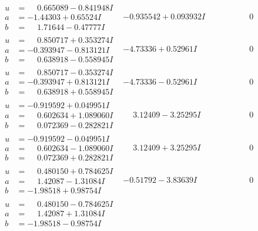 \documentclass[1p]{elsarticle_modified}
\theoremstyle{definition}
\begin{document}
$$\begin{array}{c|c|c}
\begin{aligned}
u &= \phantom{-}0.665089 - 0.841948 I \\
a &= -1.44303 + 0.65524 I \\
b &= \phantom{-}1.71644 - 0.47777 I\end{aligned}
 & -0.935542 + 0.093932 I & \phantom{-0.000000 } 0 \\ \hline\begin{aligned}
u &= \phantom{-}0.850717 + 0.353274 I \\
a &= -0.393947 - 0.813121 I \\
b &= \phantom{-}0.638918 - 0.558945 I\end{aligned}
 & -4.73336 + 0.52961 I & \phantom{-0.000000 } 0 \\ \hline\begin{aligned}
u &= \phantom{-}0.850717 - 0.353274 I \\
a &= -0.393947 + 0.813121 I \\
b &= \phantom{-}0.638918 + 0.558945 I\end{aligned}
 & -4.73336 - 0.52961 I & \phantom{-0.000000 } 0 \\ \hline\begin{aligned}
u &= -0.919592 + 0.049951 I \\
a &= \phantom{-}0.602634 + 1.089060 I \\
b &= \phantom{-}0.072369 - 0.282821 I\end{aligned}
 & \phantom{-}3.12409 - 3.25295 I & \phantom{-0.000000 } 0 \\ \hline\begin{aligned}
u &= -0.919592 - 0.049951 I \\
a &= \phantom{-}0.602634 - 1.089060 I \\
b &= \phantom{-}0.072369 + 0.282821 I\end{aligned}
 & \phantom{-}3.12409 + 3.25295 I & \phantom{-0.000000 } 0 \\ \hline\begin{aligned}
u &= \phantom{-}0.480150 + 0.784625 I \\
a &= \phantom{-}1.42087 - 1.31084 I \\
b &= -1.98518 + 0.98754 I\end{aligned}
 & -0.51792 - 3.83639 I & \phantom{-0.000000 } 0 \\ \hline\begin{aligned}
u &= \phantom{-}0.480150 - 0.784625 I \\
a &= \phantom{-}1.42087 + 1.31084 I \\
b &= -1.98518 - 0.98754 I\end{aligned}

\end{array}$$
\end{document}
